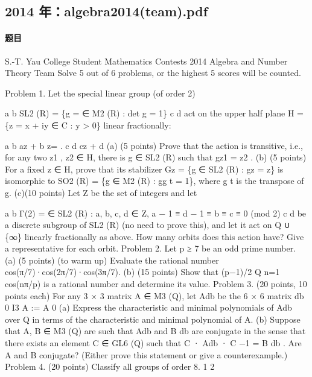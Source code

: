 \documentclass[UTF8,12pt]{ctexart}
\begin{document}
\subsection{2014 年：algebra2014(team).pdf}
\paragraph{题目}
S.-T. Yau College Student Mathematics Contests 2014 Algebra and Number Theory Team Solve 5 out of 6 problems, or the highest 5 scores will be counted.

Problem 1. Let the special linear group (of order 2)

a b SL2 (R) = \{g = ∈ M2 (R) : det g = 1\} c d act on the upper half plane H = \{z = x + iy ∈ C : y > 0\} linear fractionally:

a b az + b z= . c d cz + d (a) (5 points) Prove that the action is transitive, i.e., for any two z1 , z2 ∈ H, there is g ∈ SL2 (R) such that gz1 = z2 . (b) (5 points) For a fixed z ∈ H, prove that its stabilizer Gz = \{g ∈ SL2 (R) : gz = z\} is isomorphic to SO2 (R) = \{g ∈ M2 (R) : gg t = 1\}, where g t is the transpose of g. (c)(10 points) Let Z be the set of integers and let

a b Γ(2) = ∈ SL2 (R) : a, b, c, d ∈ Z, a − 1 ≡ d − 1 ≡ b ≡ c ≡ 0 (mod 2) c d be a discrete subgroup of SL2 (R) (no need to prove this), and let it act on Q ∪ \{∞\} linearly fractionally as above. How many orbits does this action have? Give a representative for each orbit. Problem 2. Let p ≥ 7 be an odd prime number. (a) (5 points) (to warm up) Evaluate the rational number cos(π/7)·cos(2π/7)·cos(3π/7). (b) (15 points) Show that (p−1)/2 Q n=1 cos(nπ/p) is a rational number and determine its value. Problem 3. (20 points, 10 points each) For any 3 × 3 matrix A ∈ M3 (Q), let Adb be the 6 × 6 matrix db 0 I3 A := A 0 (a) Express the characteristic and minimal polynomials of Adb over Q in terms of the characteristic and minimal polynomial of A. (b) Suppose that A, B ∈ M3 (Q) are such that Adb and B db are conjugate in the sense that there exists an element C ∈ GL6 (Q) such that C · Adb · C −1 = B db . Are A and B conjugate? (Either prove this statement or give a counterexample.) Problem 4. (20 points) Classify all groups of order 8. 1 2
\end{document}
